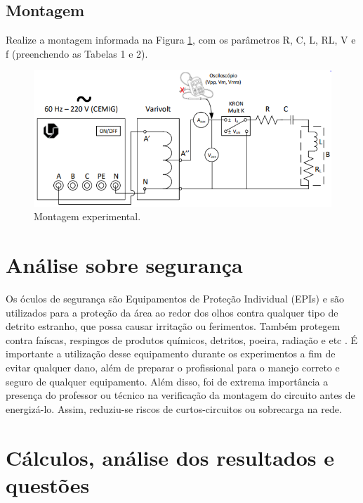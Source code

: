 \documentclass[a4paper,12pt,oneside,openany,table,xcdraw]{article}
\begin{document}
\subsection{Montagem} %

Realize a montagem informada na Figura \ref{fig1}, com os parâmetros R, C, L, RL, V e f (preenchendo as
Tabelas 1 e 2). 

\begin{figure}[H]
\centering
\captionsetup{font=scriptsize}
\includegraphics[width=14.5cm]{fig1}
\caption{Montagem experimental.}
\label{fig1}
\end{figure}


\section{Análise sobre segurança} %
Os óculos de segurança são Equipamentos de Proteção Individual (EPIs) e são utilizados para a proteção da área ao redor dos olhos contra qualquer tipo de detrito estranho, que possa causar irritação ou ferimentos. Também protegem contra faíscas, respingos de produtos químicos, detritos, poeira, radiação e etc \cite{safe}.
É importante a utilização desse equipamento durante os experimentos a fim de evitar qualquer dano, além de preparar o profissional para o manejo correto e seguro de qualquer equipamento.
Além disso, foi de extrema importância a presença do professor ou técnico na verificação da montagem do circuito antes de energizá-lo. Assim, reduziu-se riscos de curtos-circuitos ou sobrecarga na rede.

\section{Cálculos, análise dos resultados e questões} %
\end{document}
